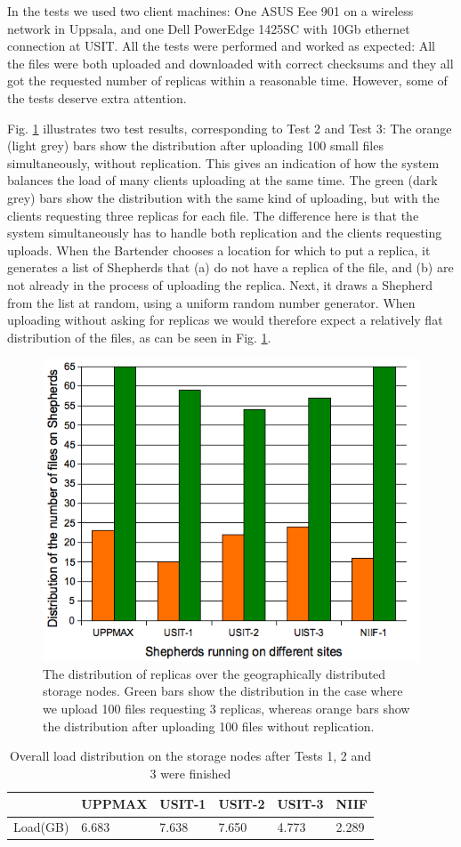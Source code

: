 \documentclass{llncs}
\begin{document}
In the tests we used two client machines: One ASUS Eee 901 on a wireless network in Uppsala, 
and one Dell PowerEdge 1425SC with 10Gb ethernet connection at USIT. All the tests were performed and worked as expected: All the files were both 
uploaded and downloaded with correct checksums and they all got the requested 
number of replicas within a reasonable time. However, some of
the tests deserve extra attention.

Fig. \ref{fig:FileDistribution} illustrates two test results,
corresponding to Test 2 and Test 3: The orange (light grey) bars show the distribution after uploading 100 small files
simultaneously, without replication. This gives an indication of how
the system balances the load of many clients uploading at the same
time. The green (dark grey) bars show the distribution with the same kind of
uploading, but with the clients requesting three replicas for each file. The
difference here is that the system simultaneously has to handle both
replication and the clients requesting uploads. When the Bartender chooses
a location for which to put a replica, it generates a list of
Shepherds that (a) do not have a replica of the file, and (b) are not
already in the process of uploading the replica. Next, it draws a
Shepherd from the list at random, using a uniform random number
generator. When uploading without asking for replicas we would
therefore expect a relatively flat distribution of the files, as can
be seen in Fig. \ref{fig:FileDistribution}. 

\begin{figure}
\centering
\includegraphics[width=0.45\columnwidth]{FileDistribution}
\caption{The distribution of replicas over the geographically distributed
  storage nodes. Green bars show the distribution in the case where
  we upload 100 files requesting 3 replicas, whereas orange bars show
  the distribution after uploading 100 files without replication. }
\label{fig:FileDistribution}
\end{figure}

\begin{table}[ht]
\centering
\begin{tabular}[width = \columnwidth]{llllll}
\hline \hline
&\small{UPPMAX}&\small{USIT-1}&\small{USIT-2}&\small{USIT-3}&\small{NIIF}\\
\hline
           \small{Load(GB)}&6.683&7.638&7.650&4.773&2.289\\
\hline
\end{tabular}
\caption{Overall load distribution on the storage nodes after Tests 1,
2 and 3 were finished}
\label{table:load distribution}  
\end{table}
\end{document}
